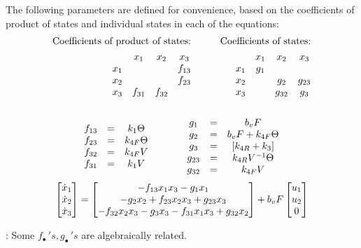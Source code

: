 The following parameters are defined for convenience, based on the coefficients
of product of states and individual states in each of the equations:
\begin{align*}
    \text{Coefficients of product of states:} &\qquad& \text{Coefficients of states:}\\
    \begin{matrix}    & x_1    & x_2      & x_3    \\
        x_1 &        &          & f_{13} \\
        x_2 &        &          & f_{23} \\
        x_3 & f_{31} & f_{32}   & \end{matrix}
    &\qquad &
    \begin{matrix}     & x_1    & x_2      & x_3    \\
        x_1  & g_1    &          &        \\
        x_2  &        & g_{2}    & g_{23} \\
        x_3  &        & g_{32}   & g_{3} \end{matrix}
\end{align*}
\begin{align*}
    \begin{matrix} 
    \\f_{13} &=& k_1 \Theta
    \\f_{23} &=& k_{4F} \Theta
    \\f_{32} &=& k_{4F} V
    \\f_{31} &=& k_1 V
     \end{matrix}
    \qquad \qquad
    \begin{matrix} 
    \\ g_1    &=& b_v F
    \\ g_2    &=& b_v F + k_{4F} \Theta
    \\ g_{3}  &=& [k_{4R}+k_3]
    \\ g_{23} &=& k_{4R} V^{-1} \Theta
    \\ g_{32} &=& k_{4F} V
     \end{matrix}
\end{align*}
\begin{equation}\label{eqn::parm_model_theta}
     \begin{bmatrix} \dot x_1 \\
        \dot x_2\\
        \dot x_3\\
         \end{bmatrix} =
    \begin{bmatrix} 
        -f_{13} x_1 x_3
        -g_1 x_1
        \\
        -g_2 x_2
        + f_{23} x_2 x_3
        + g_{23} x_3
        \\
        -f_{32} x_2 x_3
        -g_3 x_3
        -f_{31} x_1 x_3
        + g_{32} x_2
     \end{bmatrix}
    + b_v F \begin{bmatrix} u_1 \\ u_2 \\ 0 \end{bmatrix}
\end{equation}

: Some $f_{\bullet}\,'s, g_{\bullet}\,'s$ are algebraically related.

